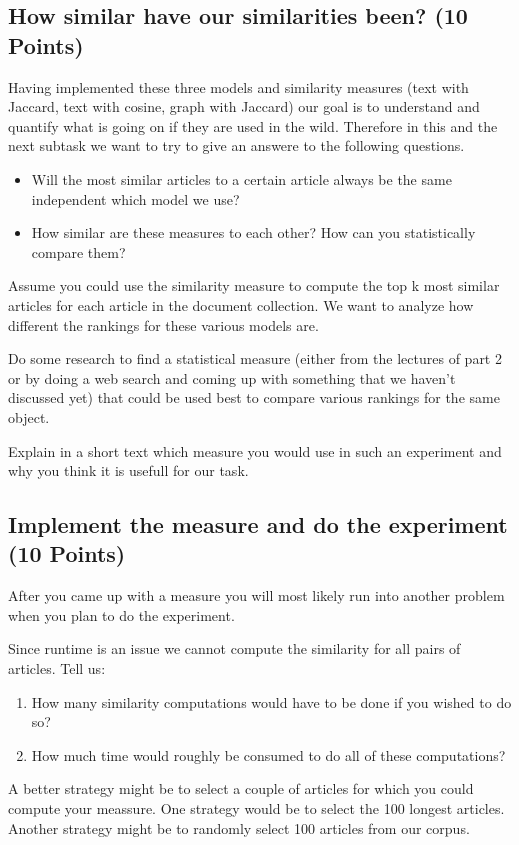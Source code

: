 \documentclass{WeSTassignment}
\begin{document}
\subsection{How similar have our similarities been? (10 Points)}
Having implemented these three models and similarity measures (text with Jaccard, text with cosine, graph with Jaccard) our goal is to understand and quantify what is going on if they are used in the wild. Therefore in this and the next subtask we want to try to give an answere to the following questions.

\begin{itemize}
\item Will the most similar articles to a certain article always be the same independent which model we use?
\item How similar are these measures to each other? How can you statistically compare them?
\end{itemize}

Assume you could use the similarity measure to compute the top k most similar articles for each article in the document collection. We want to analyze how different the rankings for these various models are. 

Do some research to find a statistical measure (either from the lectures of part 2 or by doing a web search and coming up with something that we haven't discussed yet) that could be used best to compare various rankings for the same object. 

Explain in a short text which measure you would use in such an experiment and why you think it is usefull for our task. 

\subsection{Implement the measure and do the experiment (10 Points)}
After you came up with a measure you will most likely run into another problem when you plan to do the experiment. 

Since runtime is an issue we cannot compute the similarity for all pairs of articles. Tell us: 
\begin{enumerate}
\item How many similarity computations would have to be done if you wished to do so? 
\item How much time would roughly be consumed to do all of these computations?
\end{enumerate}

A better strategy might be to select a couple of articles for which you could compute your meassure. One strategy would be to select the 100 longest articles. Another strategy might be to randomly select 100 articles from our corpus. 
\end{document}
